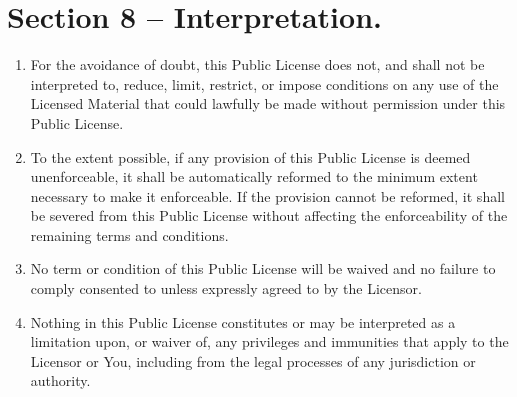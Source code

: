 \section{Section 8 – Interpretation.}
\label{section8}

\begin{enumerate}[label=\alph*.]
  \item For the avoidance of doubt, this Public License does not, and shall not be interpreted to, reduce, limit, restrict, or impose conditions on any use of the Licensed Material that could lawfully be made without permission under this Public License.

  \item   To the extent possible, if any provision of this Public License is deemed unenforceable, it shall be automatically reformed to the minimum extent necessary to make it enforceable. If the provision cannot be reformed, it shall be severed from this Public License without affecting the enforceability of the remaining terms and conditions.

  \item No term or condition of this Public License will be waived and no failure to comply consented to unless expressly agreed to by the Licensor.

  \item Nothing in this Public License constitutes or may be interpreted as a limitation upon, or waiver of, any privileges and immunities that apply to the Licensor or You, including from the legal processes of any jurisdiction or authority.
\end{enumerate}

